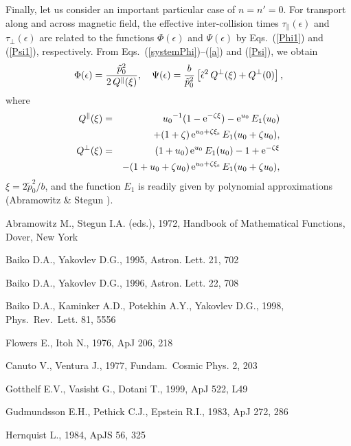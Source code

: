 \documentclass{aa}
\newcommand{\beq}{\begin{equation}}
\newcommand{\eeq}{\end{equation}}
\begin{document}
{{Finally, let us consider an important particular case
of $n=n'=0$. For transport along and across magnetic field,
the effective inter-collision times $\tau_\|(\epsilon)$
and $\tau_\perp(\epsilon)$ 
are related to the functions $\Phi(\epsilon)$ and $\Psi(\epsilon)$
by Eqs.~(\ref{Phi1}) and (\ref{Psi1}), respectively.
From Eqs.~(\ref{systemPhi})--(\ref{a})
and (\ref{Psi}), we obtain
\beq
   \Phi(\epsilon) = {\tilde p_0^2 \over 2\,Q^\|(\xi) } ,
\label{Phi2}
\quad
   \Psi(\epsilon) = { b\over\tilde p_0^2}
       \left[ \tilde\epsilon^2\, Q^\perp(\xi)
           + Q^\perp(0) \right],
\eeq
where
\begin{eqnarray}
 Q^\|(\xi) & = & {u_0}^{-1}(1-\mathrm{e}^{-\zeta\xi})
        - \mathrm{e}^{u_0} \, E_1({u_0})
\nonumber\\&&
+ (1+\zeta) \, \mathrm{e}^{{u_0}+\zeta\xi_{\rm s}}\,
        E_1({u_0}+\zeta {u_0}),
\\
   Q^\perp(\xi) &=& (1+{u_0}) \,\mathrm{e}^{u_0} \, E_1(u_0) -1
         + \mathrm{e}^{-\zeta\xi}
\nonumber\\&&
-
 (1+{u_0}+\zeta {u_0}) \,\mathrm{e}^{{u_0}+\zeta \xi_{\rm s}} \,
     E_1({u_0}+\zeta {u_0}) ,
\label{Q00perp}
\end{eqnarray}
$\xi=2\tilde p_0^2/b$,
and the function $E_1$ is readily given by polynomial approximations
(Abramowitz \& Stegun \cite{Abramowitz}).

\begin{thebibliography}{} 

Abramowitz M., Stegun I.A. (eds.), 1972, Handbook of 
Mathematical Functions, Dover, New York
 
   Baiko D.A., Yakovlev D.G., 1995, Astron. Lett. 21, 702 
 
   Baiko D.A., Yakovlev D.G., 1996, Astron. Lett. 22, 708

Baiko D.A., Kaminker A.D., Potekhin A.Y., Yakovlev D.G., 1998,
Phys.\ Rev.\ Lett. 81, 5556
 
Flowers E., Itoh N., 1976, ApJ 206, 218 
 
Canuto V., Ventura J., 1977, Fundam.\ Cosmic Phys. 2, 203

Gotthelf E.V., Vasisht G., Dotani T., 1999, ApJ 522, L49

Gudmundsson E.H., Pethick C.J., Epstein R.I., 1983, ApJ 272, 286 

Hernquist L., 1984, ApJS 56, 325


\end{thebibliography}}}
\end{document}
